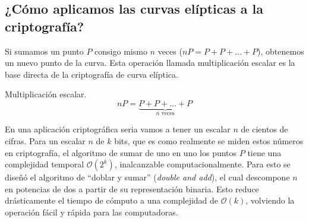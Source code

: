 \subsection{¿Cómo aplicamos las curvas elípticas a la criptografía?}

Si sumamos un punto $P$ consigo mismo $n$ veces ($nP = P + P + \dots + P$), obtenemos un nuevo punto de la curva. Esta operación llamada multiplicación escalar es la base directa de la criptografía de curva elíptica.

\begin{definition} Multiplicación escalar.
$$nP = \underbrace{P + P + \dots + P}_{n \text{ veces}}$$
\end{definition}

En una aplicación criptográfica seria vamos a tener un escalar $n$ de cientos de cifras. Para un escalar $n$ de $k$ bits, que es como realmente se miden estos números en criptografía, el algoritmo de sumar de uno en uno los puntos $P$ tiene una complejidad temporal $\mathcal{O}(2^k)$, inalcanzable computacionalmente. Para esto se diseñó el algoritmo de ``doblar y sumar'' (\textit{double and add}), el cual descompone $n$ en potencias de dos a partir de su representación binaria. Esto reduce drásticamente el tiempo de cómputo a una complejidad de $\mathcal{O}(k)$, volviendo la operación fácil y rápida para las computadoras.


